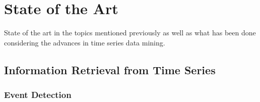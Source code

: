 
%

\chapter{State of the Art}
\label{cha:stateofart}

State of the art in the topics mentioned previously as well as what has been done considering the advances in time series data mining.



\section{Information Retrieval from Time Series} %
\label{sec:if_timeseries}

\subsection{Event Detection}

